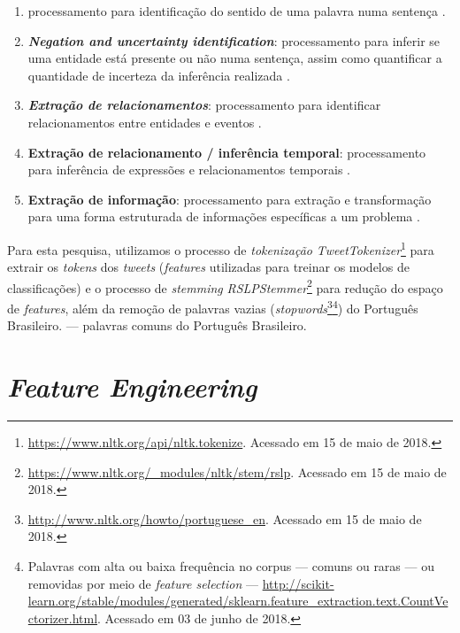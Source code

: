 \documentclass[
	12pt,				%
	oneside,			%
	a4paper,			%
	english,			%
	brazil				%
	]{abntex2ppgsi}
\begin{document}
\begin{enumerate}
\begin{enumerate}
\item{} processamento para identificação do sentido de uma palavra numa sentença \cite{nadkarni2011natural}. 
\item \textbf{\textit{Negation and uncertainty identification}}: processamento para inferir se uma entidade está presente ou não numa sentença, assim como quantificar a quantidade de incerteza da inferência realizada \cite{nadkarni2011natural}.
\item \textbf{\textit{Extração de relacionamentos}}: processamento para identificar relacionamentos entre entidades e eventos \cite{nadkarni2011natural}.
\item \textbf{Extração de relacionamento / inferência temporal}: processamento para inferência de expressões e relacionamentos temporais \cite{nadkarni2011natural}.
\item \textbf{Extração de informação}: processamento para extração e transformação para uma forma estruturada de informações específicas a um problema \cite{nadkarni2011natural}.
\end{enumerate}
\end{enumerate}

Para esta pesquisa, utilizamos o processo de \textit{tokenização} \textit{TweetTokenizer}\footnote {\url{https://www.nltk.org/api/nltk.tokenize}. Acessado em 15 de maio de 2018.} para extrair os \textit{tokens} dos \textit{tweets} (\textit{features} utilizadas para treinar os modelos de classificações) e o processo de \textit{stemming} \textit {RSLPStemmer}\footnote{\url{https://www.nltk.org/\_modules/nltk/stem/rslp}. Acessado em 15 de maio de 2018.} para redução do espaço de \textit{features}, além da remoção de palavras vazias (\textit{stopwords}\footnote{\url{http://www.nltk.org/howto/portuguese\_en}. Acessado em 15 de maio de 2018.}\footnote{Palavras com alta ou baixa frequência no corpus --- comuns ou raras --- ou removidas por meio de \textit{feature selection} --- \url{http://scikit-learn.org/stable/modules/generated/sklearn.feature_extraction.text.CountVectorizer.html}. Acessado em 03 de junho de 2018.}) do Português Brasileiro.  --- palavras comuns do Português Brasileiro.

\section{\textit{Feature Engineering}}
\label{featuresEng}
\end{document}
